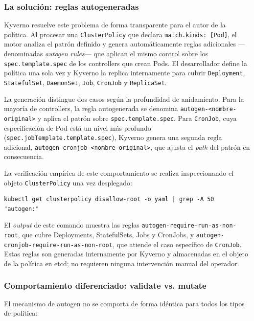 \subsubsection*{La solución: reglas autogeneradas}

Kyverno resuelve este problema de forma transparente para el autor de la política. Al procesar una \texttt{ClusterPolicy} que declara \texttt{match.kinds:\,[Pod]}, el motor analiza el patrón definido y genera automáticamente reglas adicionales —denominadas \textit{autogen rules}— que aplican el mismo control sobre los \texttt{spec.template.spec} de los controllers que crean Pods. El desarrollador define la política una sola vez y Kyverno la replica internamente para cubrir \texttt{Deployment}, \texttt{StatefulSet}, \texttt{DaemonSet}, \texttt{Job}, \texttt{CronJob} y \texttt{ReplicaSet}.

La generación distingue dos casos según la profundidad de anidamiento. Para la mayoría de controllers, la regla autogenerada se denomina \texttt{autogen-<nombre-original>} y aplica el patrón sobre \texttt{spec.template.spec}. Para \texttt{CronJob}, cuya especificación de Pod está un nivel más profundo (\texttt{spec.jobTemplate.\allowbreak{}template.spec}), Kyverno genera una segunda regla adicional, \texttt{autogen-cronjob-<nombre-original>}, que ajusta el \textit{path} del patrón en consecuencia.

La verificación empírica de este comportamiento se realiza inspeccionando el objeto \texttt{ClusterPolicy} una vez desplegado:

\begin{lstlisting}
kubectl get clusterpolicy disallow-root -o yaml | grep -A 50 "autogen:"
\end{lstlisting}

El \textit{output} de este comando muestra las reglas \texttt{autogen-require-run-as-\allowbreak{}non-root}, que cubre Deployments, StatefulSets, Jobs y CronJobs, y \texttt{autogen-cronjob-require-run-as-\allowbreak{}non-root}, que atiende el caso específico de \texttt{CronJob}. Estas reglas son generadas internamente por Kyverno y almacenadas en el objeto de la política en etcd; no requieren ninguna intervención manual del operador.

\subsubsection*{Comportamiento diferenciado: validate vs. mutate}

El mecanismo de autogen no se comporta de forma idéntica para todos los tipos de política:

